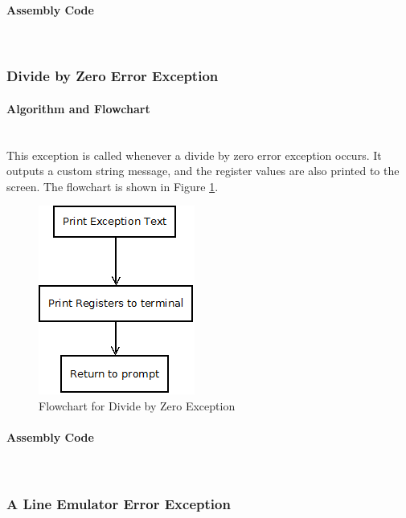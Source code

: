\documentclass[12pt]{article}
\begin{document}
			\paragraph{Assembly Code}~\\	
			
			\subsubsection{Divide by Zero Error Exception}
			\paragraph{Algorithm and Flowchart}~\\
			This exception is called whenever a divide by zero error exception occurs. It outputs a custom string message, and the register values are also printed to the screen. The flowchart is shown in Figure \ref{fig:zero}.
			
			\begin{figure}[H]
				\centering
				\includegraphics[width=0.3\linewidth]{Exception}
				\caption{Flowchart for Divide by Zero Exception}
				\label{fig:zero}
			\end{figure}
			\paragraph{Assembly Code}~\\	
			
			\subsubsection{A Line Emulator Error Exception}
\end{document}
